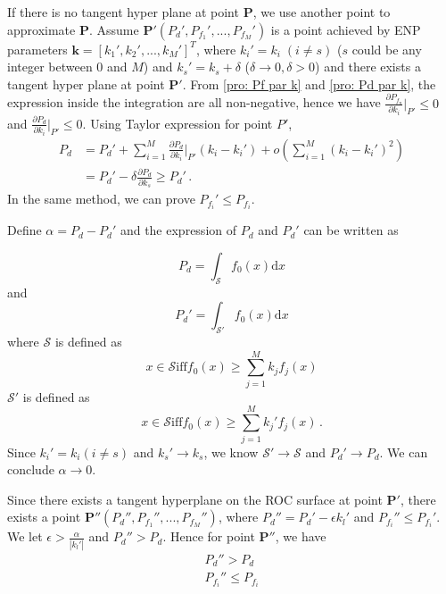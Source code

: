 \documentclass[12pt,journal,a4paper,twoside,doublecolumn]{IEEEtran}
\begin{document}
\begin{spacing}{1.0}
If there is no tangent hyper plane at point $\mathbf{P}$, we use another point to approximate $\mathbf{P}$. 
Assume $\mathbf{P}' (P_d', P_{f_1}', ..., P_{f_M}')$ is a point achieved by ENP parameters $\mathbf{k}=[k_1', k_2', ..., k_M']^T$, where $k_i' = k_i \;(i \neq s)$ ($s$ could be any integer between $0$ and $M$) and $k_s' = k_s + \delta$ ($\delta \rightarrow 0, \delta > 0$) and there exists a tangent hyper plane at point $\mathbf{P}'$. From \eqref{pro: Pf par k} and \eqref{pro: Pd par k}, the expression inside the integration are all non-negative, hence we have $\frac{\partial P_{f_n}}{\partial k_i}|_{P'} \leq 0$ and $\frac{\partial P_d}{\partial k_i}|_{P'} \leq 0$. Using Taylor expression for point $P'$,
\begin{equation}
\begin{split}
P_d &= P_d' + \sum_{i=1}^{M}\frac{\partial P_d}{\partial k_i}\bigg|_{P'}(k_i - k_i') + o(\sum_{i=1}^{M}(k_i-k_i')^2)\\
&= P_d' - \delta\frac{\partial P_d}{\partial k_s} \geq P_d'\,.
\end{split}
\end{equation}
In the same method, we can prove $P_{f_i}' \leq P_{f_i}$.

Define $\alpha = P_d - P_d'$ and the expression of $P_d$ and $P_d'$ can be written as

\begin{equation}
  P_d = \int_{\mathcal{S}}f_0(x)\mathrm{d}x 
\end{equation}
and
\begin{equation}
  P_d' = \int_{\mathcal{S}'}f_0(x)\mathrm{d}x 
\end{equation}
where $\mathcal{S}$ is defined as 
\begin{equation}
x \in \mathcal{S} \text{iff} f_0(x) \geq \sum_{j=1}^M k_jf_j(x)
\end{equation}
$\mathcal{S}'$ is defined as
\begin{equation}
x \in \mathcal{S} \text{iff} f_0(x) \geq \sum_{j=1}^M k_j'f_j(x)\,.
\end{equation}
Since $k_i' = k_i (i \neq s)$ and $k_s' \rightarrow k_s$, we know $\mathcal{S}' \rightarrow \mathcal{S}$ and $P_d' \rightarrow P_d$. We can conclude $\alpha \rightarrow 0$.

Since there exists a tangent hyperplane on the ROC surface at point $\mathbf{P}'$, there exists a point $\mathbf{P}'' (P_d'', P_{f_1}'', ..., P_{f_M}'')$, where $P_d'' = P_d' - \epsilon k_l'$ and $P_{f_i}'' \leq P_{f_i}'$. We let $\epsilon > \frac{\alpha}{|k_l'|}$ and $P_d'' > P_d$. Hence for point $\mathbf{P}''$, we have 
\begin{equation}
\begin{split}
P_d'' > P_d\\
P_{f_i}'' \leq P_{f_i}
\end{split}
\end{equation}



\end{spacing}
\end{document}
